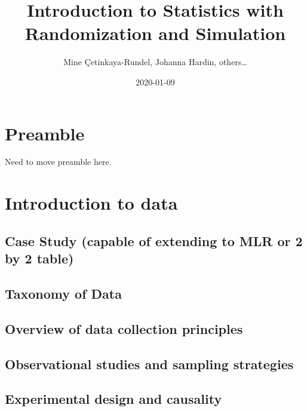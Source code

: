 \documentclass[]{book}
\title{Introduction to Statistics with Randomization and Simulation}
\author{Mine Çetinkaya-Rundel, Johanna Hardin, others\ldots{}}
\date{2020-01-09}
\begin{document}
\maketitle

{
\setcounter{tocdepth}{1}
\tableofcontents
}
\hypertarget{preamble}{%
\chapter*{Preamble}\label{preamble}}

Need to move preamble here.

\hypertarget{intro-to-data}{%
\chapter{Introduction to data}\label{intro-to-data}}

\hypertarget{case-study-capable-of-extending-to-mlr-or-2-by-2-table}{%
\section{Case Study (capable of extending to MLR or 2 by 2 table)}\label{case-study-capable-of-extending-to-mlr-or-2-by-2-table}}

\hypertarget{taxonomy-of-data}{%
\section{Taxonomy of Data}\label{taxonomy-of-data}}

\hypertarget{overview-of-data-collection-principles}{%
\section{Overview of data collection principles}\label{overview-of-data-collection-principles}}

\hypertarget{observational-studies-and-sampling-strategies}{%
\section{Observational studies and sampling strategies}\label{observational-studies-and-sampling-strategies}}

\hypertarget{experimental-design-and-causality}{%
\section{Experimental design and causality}\label{experimental-design-and-causality}}
\end{document}
